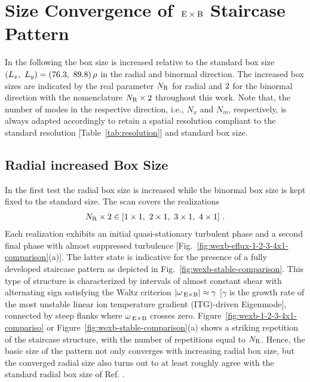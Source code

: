 
\newpage
\section{Size Convergence of $\mathrm{\:E}\times\mathrm{B}$ Staircase Pattern}
\label{sec:convergence}

In the following the box size is increased relative to the standard box size $(L_x,~L_y) = (76.3,~89.8)\,\rho$ in the radial and binormal direction. The increased box sizes are indicated by the real parameter $N_\mathrm{R}$ for radial and $2$ for the binormal direction with the nomenclature $N_\mathrm{R}\times 2$ throughout this work. 
Note that, the number of modes in the respective direction, i.e., $N_x$ and $N_m$, respectively, is always adapted accordingly to retain a spatial resolution compliant to the standard resolution [Table~\ref{tab:resolution}] and standard box size. \\

\subsection{Radial increased Box Size}
\label{sub:radial}

In the first test the radial box size is increased while the binormal box size is kept fixed to the standard size. The scan covers the realizations 
\begin{gather*}
	N_\mathrm{R} \times 2 \in [1\times1,~2\times1,~3\times1,~4\times1]~.
\end{gather*}
Each realization exhibits an initial quasi-stationary turbulent phase and a second final \cite{Peeters2016} phase with almost suppressed turbulence [Fig.~\ref{fig:wexb-eflux-1-2-3-4x1-comparison}(a)].
The latter state is indicative for the presence of a fully developed staircase pattern as depicted in Fig.~\ref{fig:wexb-stable-comparison}. 
This type of structure is characterized by intervals of almost constant shear with alternating sign satisfying the Waltz criterion $|\omega_{\mathrm{\:E \times B}}| \approx \gamma$\cite{Waltz1994, Waltz1998} [$\gamma$ is the growth rate of the most unstable linear ion temperature gradient (ITG)-driven Eigenmode], connected by steep flanks where $\omega_{\mathrm{\:E \times B}}$ crosses zero.
Figure~\ref{fig:wexb-1-2-3-4x1-compariso} or Figure~\ref{fig:wexb-stable-comparison}(a) shows a striking repetition of the staircase structure, with the number of repetitions equal to $N_\mathrm{R}$.
Hence, the basic size of the pattern not only converges with increasing radial box size, but the converged radial size also turns out to at least roughly agree with the standard radial box size of Ref. . \bigskip

